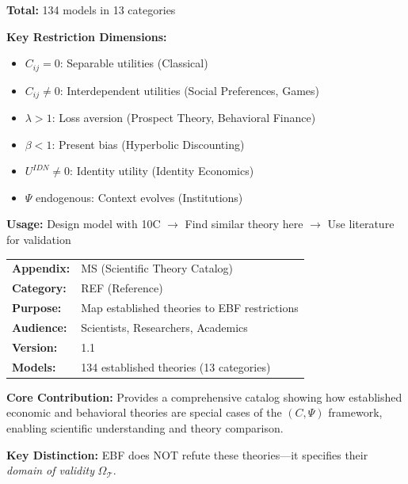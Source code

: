 \begin{tcolorbox}[colback=yellow!10!white, colframe=orange!75!black,
    title=\textbf{Quick Reference: Theory Catalog}]

\textbf{Total:} 134 models in 13 categories

\textbf{Key Restriction Dimensions:}
\begin{itemize}[nosep]
    \item $C_{ij} = 0$: Separable utilities (Classical)
    \item $C_{ij} \neq 0$: Interdependent utilities (Social Preferences, Games)
    \item $\lambda > 1$: Loss aversion (Prospect Theory, Behavioral Finance)
    \item $\beta < 1$: Present bias (Hyperbolic Discounting)
    \item $U^{IDN} \neq 0$: Identity utility (Identity Economics)
    \item $\Psi$ endogenous: Context evolves (Institutions)
\end{itemize}

\textbf{Usage:} Design model with 10C $\rightarrow$ Find similar theory here $\rightarrow$ Use literature for validation

\end{tcolorbox}

\begin{tcolorbox}[colback=blue!5!white, colframe=blue!75!black,
    title=\textbf{Appendix UNMAPPED_MS: REF-MODELSPACE}]

\begin{tabular}{@{}ll@{}}
\textbf{Appendix:} & MS (Scientific Theory Catalog) \\
\textbf{Category:} & REF (Reference) \\
\textbf{Purpose:} & Map established theories to EBF restrictions \\
\textbf{Audience:} & Scientists, Researchers, Academics \\
\textbf{Version:} & 1.1 \\
\textbf{Models:} & 134 established theories (13 categories) \\
\end{tabular}

\tcblower

\textbf{Core Contribution:} Provides a comprehensive catalog showing how
established economic and behavioral theories are special cases of the
$(C, \Psi)$ framework, enabling scientific understanding and theory comparison.

\textbf{Key Distinction:} EBF does NOT refute these theories—it specifies
their \textit{domain of validity} $\Omega_\mathcal{T}$.

\end{tcolorbox}

